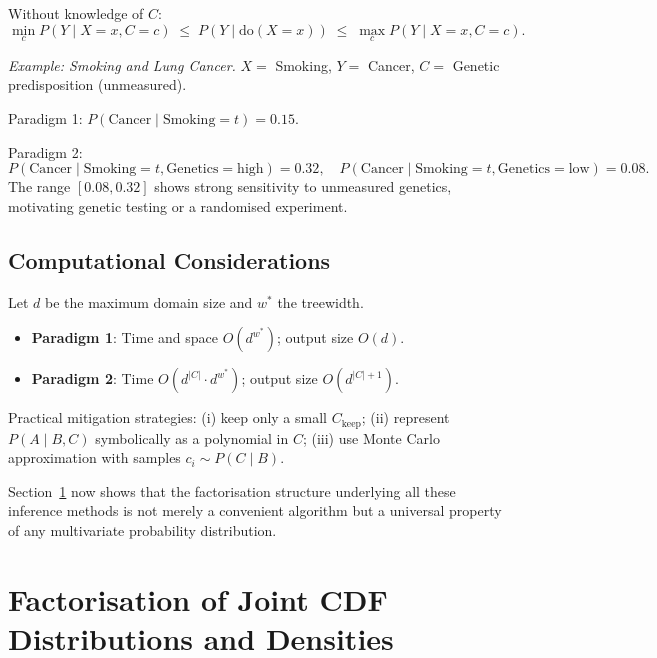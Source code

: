 \begin{theorem}
Without knowledge of $C$:
\begin{equation}
\min_c P(Y\mid X=x,C=c)
\;\leq\;P(Y\mid\mathrm{do}(X=x))
\;\leq\;\max_c P(Y\mid X=x,C=c).
\end{equation}
\end{theorem}

\textit{Example: Smoking and Lung Cancer.}
$X=$ Smoking, $Y=$ Cancer, $C=$ Genetic predisposition (unmeasured).

Paradigm 1: $P(\text{Cancer}\mid\text{Smoking}=t)=0.15$.

Paradigm 2:
\[
P(\text{Cancer}\mid\text{Smoking}=t,\text{Genetics}=\text{high})=0.32,\quad
P(\text{Cancer}\mid\text{Smoking}=t,\text{Genetics}=\text{low})=0.08.
\]
The range $[0.08,0.32]$ shows strong sensitivity to unmeasured genetics,
motivating genetic testing or a randomised experiment.

\subsection{Computational Considerations}

\begin{proposition}[Complexity]
Let $d$ be the maximum domain size and $w^*$ the treewidth.
\begin{itemize}
\item \textbf{Paradigm 1}: Time and space $O(d^{w^*})$; output size $O(d)$.
\item \textbf{Paradigm 2}: Time $O(d^{|C|}{\cdot}d^{w^*})$; output size
      $O(d^{|C|+1})$.
\end{itemize}
\end{proposition}

Practical mitigation strategies: (i) keep only a small $C_{\mathrm{keep}}$;
(ii) represent $P(A\mid B,C)$ symbolically as a polynomial in $C$; (iii)
use Monte Carlo approximation with samples $c_i\sim P(C\mid B)$.

\medskip
Section~\ref{sec:factorisation} now shows that the factorisation structure
underlying all these inference methods is not merely a convenient algorithm
but a universal property of any multivariate probability distribution.
\section{Factorisation of Joint CDF Distributions and Densities}
\label{sec:factorisation}

